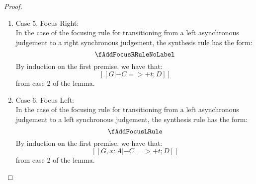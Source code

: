 \begin{proof}
\begin{enumerate}
\begin{enumerate}
      \end{enumerate}
    \item Case 5. Focus Right: \fAddFocusRName \\
          In the case of the focusing rule for transitioning from a left asynchronous judgement to a right synchronous judgement, the synthesis rule has the form:
          \[
            \fAddFocusRRuleNoLabel
          \]
          By induction on the first premise, we have that:
          \[
            [[ G |- C =>+ t ; D ]] \tag{ih}
          \]
          from case 2 of the lemma.
    \item Case 6. Focus Left: \fAddFocusLName \\
          In the case of the focusing rule for transitioning from a left asynchronous judgement to a left synchronous judgement, the synthesis rule has the form:
          \[
            \fAddFocusLRule
          \]
          By induction on the first premise, we have that:
          \[
            [[ G, x : A |- C =>+ t ; D ]] \tag{ih}
          \]
          from case 2 of the lemma.

  \end{enumerate}
\end{proof}

